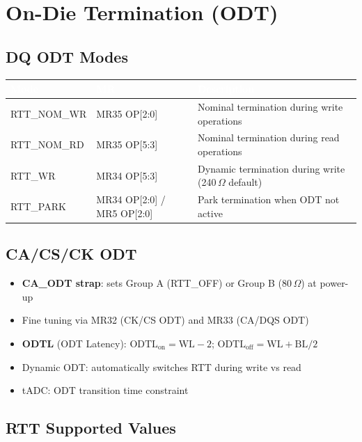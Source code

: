 \documentclass[10pt,a4paper,twoside]{article}
\newcommand{\thd}[1]{\cellcolor{navyblue}\textcolor{white}{\textbf{#1}}}
\newcommand{\trow}{\rowcolor{lightgray}}
\newcommand{\talt}{\rowcolor{skyblue!30}}
\begin{document}
\section{On-Die Termination (ODT)}

\subsection{DQ ODT Modes}

\begin{center}
\begin{tabularx}{\linewidth}{@{} l l X @{}}
\toprule
\thd{Mode} & \thd{MR} & \thd{Description} \\
\midrule
\trow RTT\_NOM\_WR & MR35 OP[2:0] & Nominal termination during write operations \\
\talt RTT\_NOM\_RD & MR35 OP[5:3] & Nominal termination during read operations \\
\trow RTT\_WR & MR34 OP[5:3] & Dynamic termination during write (240\,$\Omega$ default) \\
\talt RTT\_PARK & MR34 OP[2:0] / MR5 OP[2:0] & Park termination when ODT not active \\
\bottomrule
\end{tabularx}
\end{center}

\subsection{CA/CS/CK ODT}

\begin{itemize}
  \item \textbf{CA\_ODT strap}: sets Group A (RTT\_OFF) or Group B (80\,$\Omega$) at power-up
  \item Fine tuning via MR32 (CK/CS ODT) and MR33 (CA/DQS ODT)
  \item \textbf{ODTL} (ODT Latency): $\text{ODTL}_{\text{on}} = \text{WL} - 2$; $\text{ODTL}_{\text{off}} = \text{WL} + \text{BL}/2$
  \item Dynamic ODT: automatically switches RTT during write vs read
  \item tADC: ODT transition time constraint
\end{itemize}

\subsection{RTT Supported Values}
\end{document}
